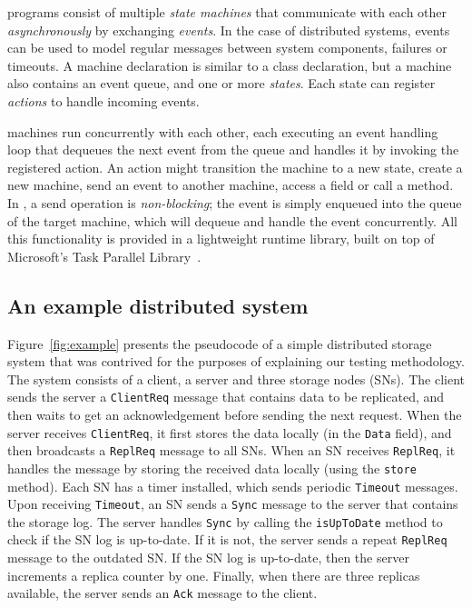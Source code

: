 \psharp programs consist of multiple \emph{state machines} that communicate with each other \emph{asynchronously} by exchanging \emph{events}. In the case of distributed systems, \psharp events can be used to model regular messages between system components, failures or timeouts. A \psharp machine declaration is similar to a \csharp class declaration, but a machine also contains an event queue, and one or more \emph{states}. Each state can register \emph{actions} to handle incoming events.

\psharp machines run concurrently with each other, each executing an event handling loop that dequeues the next event from the queue and handles it by invoking the registered action. An action might transition the machine to a new state, create a new machine, send an event to another machine, access a field or call a method. In \psharp, a send operation is \emph{non-blocking}; the event is simply enqueued into the queue of the target machine, which will dequeue and handle the event concurrently. All this functionality is provided in a lightweight runtime library, built on top of Microsoft's Task Parallel Library~\cite{leijen2009tpl}.

\vspace{-2mm}
\subsection{An example distributed system}
\label{sec:overview:example}

Figure~\ref{fig:example} presents the pseudocode of a simple distributed storage system that was contrived for the purposes of explaining our testing methodology. The system consists of a client, a server and three storage nodes (SNs). The client sends the server a \texttt{ClientReq} message that contains data to be replicated, and then waits to get an acknowledgement before sending the next request. When the server receives \texttt{ClientReq}, it first stores the data locally (in the \texttt{Data} field), and then broadcasts a \texttt{ReplReq} message to all SNs. When an SN receives \texttt{ReplReq}, it handles the message by storing the received data locally (using the \texttt{store} method). Each SN has a timer installed, which sends periodic \texttt{Timeout} messages. Upon receiving \texttt{Timeout}, an SN sends a \texttt{Sync} message to the server that contains the storage log. The server handles \texttt{Sync} by calling the \texttt{isUpToDate} method to check if the SN log is up-to-date. If it is not, the server sends a repeat \texttt{ReplReq} message to the outdated SN. If the SN log is up-to-date, then the server increments a replica counter by one. Finally, when there are three replicas available, the server sends an \texttt{Ack} message to the client.

